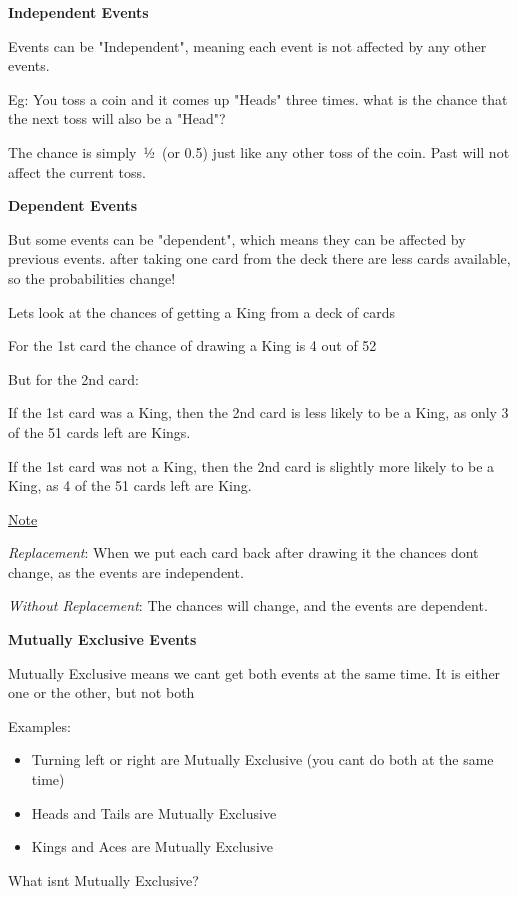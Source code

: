 \documentclass[
]{book}
\begin{document}
\textbf{Independent Events}

Events can be "Independent", meaning each event is not affected by any other events.

Eg: You toss a coin and it comes up "Heads" three times. what is the chance that the next toss will also be a "Head"?

The chance is simply~½~(or 0.5) just like any other toss of the coin. Past will not affect the current toss.

\textbf{Dependent Events}

But some events can be "dependent", which means they can be affected by previous events. after taking one card from the deck there are less
cards available, so the probabilities change!

Let\textquotesingle s look at the chances of getting a King from a deck of cards

For the 1st card the chance of drawing a King is 4 out of 52

But for the 2nd card:

If the 1st card was a King, then the 2nd card is less likely to be a
King, as only 3 of the 51 cards left are Kings.

If the 1st card was not a King, then the 2nd card is slightly more
likely to be a King, as 4 of the 51 cards left are King.

\ul{Note}

\emph{Replacement}: When we put each card back after drawing it the chances don\textquotesingle t change, as the events are independent.

\emph{Without Replacement}: The chances will change, and the events are dependent.

\textbf{Mutually Exclusive Events}

Mutually Exclusive means we can\textquotesingle t get both events at the same time. It
is either one or the other, but not both

Examples:

\begin{itemize}
\item
  Turning left or right are Mutually Exclusive (you can\textquotesingle t do both at
  the same time)
\item
  Heads and Tails are Mutually Exclusive
\item
  Kings and Aces are Mutually Exclusive
\end{itemize}

What isn\textquotesingle t Mutually Exclusive?
\end{document}
